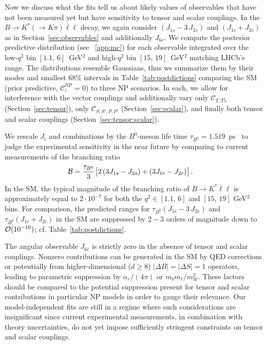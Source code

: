 \documentclass[twocolumn,epjc3]{svjour3}
\numberwithin{equation}{section}
\def \refsec#1{Section~\ref{#1}}
\def \reftab#1{Table~\ref{#1}}
\newcommand{\wilson}[2][{}]{\mathcal{C}_{#2}^{\mathrm{#1}}}
\renewcommand{\[}{\big[}
\renewcommand{\]}{\big]}
\renewcommand{\(}{\big(}
\renewcommand{\)}{\big)}
\def \BR{{\cal B}}                               %
\begin{document}
Now we discuss what the {fits tell} us about likely values of observables that
have not been measured yet but have sensitivity to tensor and scalar couplings.
In the $B\to K^*(\to K\pi)\bar\ell\ell$ decay, we again consider $(J_{1s} - 3\,
J_{2s})$ and $(J_{1c} + J_{2c})$ as in \refsec{sec:observables} and additionally
$J_{6c}$. We compute the posterior predictive distribution (see ~\ref{app:mc})
for each observable integrated over the low-$q^2$ bin $[1.1,\, 6]$~GeV$^2$ and
high-$q^2$ bin $[15,\, 19]$~GeV$^2$ matching LHCb's range. The distributions
resemble Gaussians, thus we summarize them by their modes and smallest 68\%
intervals in \reftab{tab:postdictions} comparing the SM (prior predictive,
$\wilson[NP]{i}=0$) to three NP scenarios. In each, we allow for interference
with the vector couplings and additionally vary only $\wilson{T,T5}$
(\refsec{sec:tensor}), only $\wilson{S,S',P,P'}$ (\refsec{sec:scalar}),
and finally both tensor and scalar couplings (\refsec{sec:tensor:scalar}).

We rescale $J_i$ and combinations by the $B^0$-meson life time
$\tau_{B^0} = 1.519$~ps~\cite{Agashe:2014kda} to judge the
experimental sensitivity in the near future by comparing to current
measurements of the branching ratio
\begin{align}
  {\BR} &
  = \frac{\tau_{B^0}}{3} \big[
    2\, (3 J_{1s} - J_{2s}) + (3 J_{1c} -  J_{2c})
  \big] \,.
\end{align}
In the SM, the typical magnitude of the branching ratio of $B\to
K^*\bar\ell\ell$ is approximately equal to $2 \cdot 10^{-7}$ for both
the {$q^2 \in [1.1,\, 6]$} and $[15,\, 19]$ GeV$^2$
bins. For comparison, the predicted ranges for $\tau_{B^0}(J_{1s} -
3\, J_{2s})$ and $\tau_{B^0}(J_{1c} + J_{2c})$ in the SM are
suppressed by $2-3$ orders of magnitude down to ${\cal O}(10^{-10})$;
cf. \reftab{tab:postdictions}.

The angular observable $J_{6c}$ is strictly zero in the absence of tensor and
scalar couplings. Nonzero contributions can be generated in the SM by QED
corrections or potentially from higher-dimensional ($d \geq 8$) $|\Delta B| =
|\Delta S| = 1$ operators, leading to parametric suppression by $\alpha_e/(4
\pi)$ or {$m_b m_\ell/m_W^2$}. These factors should be compared to the potential
suppression present for tensor and scalar contributions in particular NP models
in order to gauge their relevance. Our model-independent fits are still in a
regime where such considerations are insignificant since current experimental
measurements, in combination with theory uncertainties, do not yet impose
{sufficiently}
stringent constraints on tensor and scalar couplings.
\end{document}
